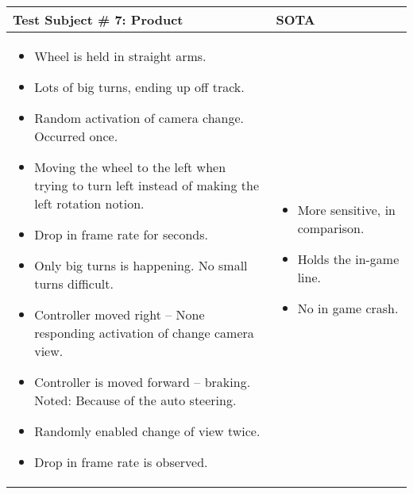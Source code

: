\begin{table}[!htbp]
\centering
\begin{tabular}{| p{3.4in} | p{2in} |}
\hline
	\textbf{Test Subject \# 7: Product} & \textbf{SOTA}\\
\hline
	\begin{itemize}
		\item Wheel is held in straight arms.
		\item Lots of big turns, ending up off track.
		\item Random activation of camera change. Occurred once.
		\item Moving the wheel to the left when trying to turn left instead of making the left rotation notion.
		\item Drop in frame rate for seconds.
		\item Only big turns is happening. No small turns difficult.
		\item Controller moved right – None responding activation of change camera view.
		\item Controller is moved forward – braking. Noted: Because of the auto steering.
		\item Randomly enabled change of view twice.
		\item Drop in frame rate is observed.
	\end{itemize}
	&
	\begin{itemize}
		\item More sensitive, in comparison.
		\item Holds the in-game line.
		\item No in game crash.
	\end{itemize}
	\\
\hline
\end{tabular}
\end{table}


